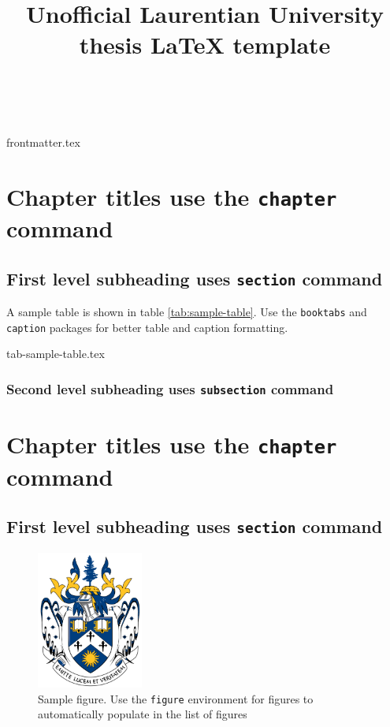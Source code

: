 \documentclass[openany, 12pt]{book}
\title{Unofficial Laurentian University thesis \LaTeX{} template}
\author{\givenname\ \surname}
\begin{document}
{frontmatter.tex}

\chapter{Chapter titles use the \texttt{chapter} command}

\section{First level subheading uses \texttt{section} command}

A sample table is shown in table \ref{tab:sample-table}.
Use the \texttt{booktabs} and \texttt{caption} packages for better table and caption formatting.

\begin{table}
    \centering
    \caption{Sample table which will automatically update in List of Tables}
    \label{tab:sample-table}
    {tab-sample-table.tex}
\end{table}

\subsection{Second level subheading uses \texttt{subsection} command}

\chapter{Chapter titles use the \texttt{chapter} command}

\section{First level subheading uses \texttt{section} command}

\begin{figure}
    \centering
    \includegraphics[width=3.5cm]{laurentian-university-coa.png}
    \caption{Sample figure. Use the \texttt{figure} environment for figures to automatically populate in the list of figures}
\end{figure}
\end{document}
